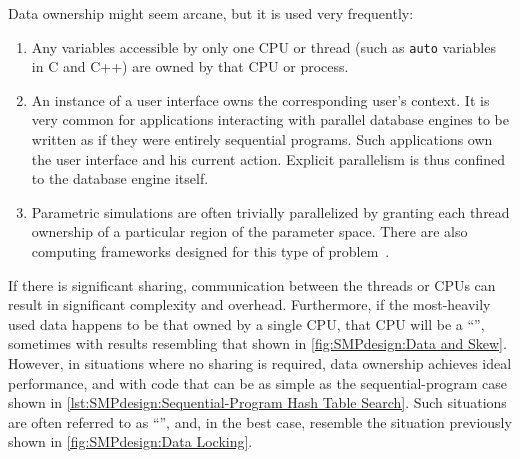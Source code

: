 Data ownership might seem arcane, but it is used very frequently:
\begin{enumerate}
\item	Any variables accessible by only one CPU or thread
	(such as {\tt auto} variables in C
	and C++) are owned by that CPU or process.
\item	An instance of a user interface owns the corresponding
	user's context.
	It is very common for applications interacting with parallel
	database engines to be written as if they were entirely
	sequential programs.
	Such applications own the user interface and his current
	action.
	Explicit parallelism is thus confined to the
	database engine itself.
\item	Parametric simulations are often trivially parallelized
	by granting each thread ownership of a particular region
	of the parameter space.
	There are also computing frameworks designed for this
	type of problem~\cite{BOINC2008}.
\end{enumerate}

If there is significant sharing, communication between the threads
or CPUs can result in significant complexity and overhead.
Furthermore, if the most-heavily used data happens to be that owned
by a single CPU, that CPU will be a ``'', sometimes with
results resembling that shown in \cref{fig:SMPdesign:Data and Skew}.
However, in situations where no sharing is required, data ownership
achieves ideal performance, and with code that can be as simple
as the sequential-program case shown in
\cref{lst:SMPdesign:Sequential-Program Hash Table Search}.
Such situations are often referred to as ``'', and, in the best case, resemble the situation
previously shown in \cref{fig:SMPdesign:Data Locking}.



